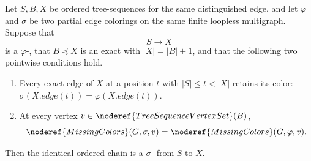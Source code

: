 \begin{lemma}
Let \(S,B,X\) be ordered tree-sequences for the same distinguished edge,
and let \(\varphi\) and \(\sigma\) be two partial edge colorings on the
same finite loopless multigraph.  Suppose that
\[
 S\longrightarrow X
\]
is a \(\varphi\)-, that
\(B\preccurlyeq X\) is an exact
 with
\(|X|=|B|+1\), and that the following two pointwise conditions hold.
\begin{enumerate}
\item Every exact edge of \(X\) at a position \(t\) with
\(|S|\leq t<|X|\) retains its color:
\(\sigma(X.\mathit{edge}(t))=\varphi(X.\mathit{edge}(t))\).
\item At every vertex \(v\in\noderef{TreeSequenceVertexSet}(B)\),
\[
 \noderef{MissingColors}(G,\sigma,v)
   =\noderef{MissingColors}(G,\varphi,v).
\]
\end{enumerate}
Then the identical ordered chain is a
\(\sigma\)- from \(S\) to \(X\).
\end{lemma}
